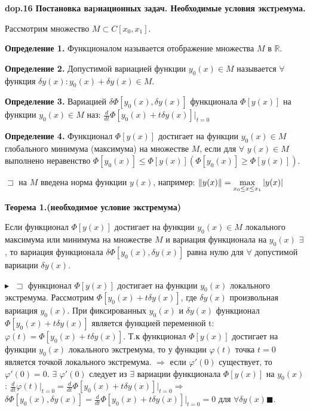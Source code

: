 \textbf{\LARGE dop.16 Постановка ваpиационных задач. Необходимые условия экстpемума.}

Рассмотрим множество $M \subset C[x_0, x_1]$.


\textbf{Определение 1.}
Функционалом называется отображение множества $M$ в $\mathbb{R}$.

\textbf{Определение 2.}
Допустимой вариацией функции $y_0(x) \in M$ называется $\forall$ функция $\delta y(x):y_0(x) + \delta y(x) \in M$.

\textbf{Определение 3.}
Вариацией $\delta\Phi[y_0(x), \delta y(x)]$ функционала
$\Phi[y(x)]$ на функции $y_0(x) \in M$ наз: $\frac{d}{dt}\Phi[y_0(x)+t\delta y(x)]\Big|_{t=0}$

\textbf{Определение 4.}
Функционал $\Phi[y(x)]$ достигает на функции
$y_0(x) \in M$ глобального минимума (максимума) на множестве $M$, если для $\forall$ $y(x) \in M$ выполнено неравенство $\Phi[y_0(x)]\leq\Phi[y(x)]  (\Phi[y_0(x)]\geq\Phi[y(x)])$.


$\sqsupset$ на  $M$ введена норма функции $y(x)$, например:
$\|y(x)\|=\displaystyle\max_{x_0\leq x \leq x_1} |y(x)|$


\textbf{Теорема 1.(необходимое условие экстремума)}

    Если функционал $\Phi[y(x)]$ достигает на функции
    $y_0(x) \in M$ локального максимума или минимума на множестве $M$ и
    вариация функционала на $y_0(x)$ $\exists$, то вариация функционала $\delta\Phi[y_0(x), \delta y(x)]$ равна нулю для $\forall$ допустимой вариации $\delta y(x)$.
    
$\blacktriangleright\;$
    $\sqsupset$ функционал $\Phi[y(x)]$ достигает на функции
    $y_0(x)$ локального экстремума. Рассмотрим $\Phi[y_0(x) + t\delta y(x)]$, где $\delta y(x)$
    произвольная вариация $y_0(x)$. При фиксированных $y_0(x)$ и $\delta y(x)$ функционал 
    $\Phi[y_0(x) + t\delta y(x)]$ является функцией переменной t:
    $\varphi(t) = \Phi[y_0(x) + t\delta y(x)].$
    Т.к  функционал $\Phi[y(x)]$ достигает на функции $y_0(x)$ локального
    экстремума, то у функции $\varphi(t)$ точка $t=0$ является точкой локального экстремума. $\Longrightarrow$ если $\varphi'(0)$ существует, то
    $\varphi'(0)=0$. $\exists$ $\varphi'(0)$ следует из $\exists$ вариации функционала $\Phi[y(x)]$ на $y_0(x)$: $\frac{d}{dt}\varphi(t)\Big|_{t=0}=\frac{d}{dt}\Phi[y_0(x)+t\delta y(x)]\Big|_{t=0} \Longrightarrow$
    $\delta \Phi[y_0(x), \delta y(x)]=\frac{d}{dt}\Phi[y_0(x)+t\delta y(x)]\Big|_{t=0}=0 \text{ для } \forall \delta y(x)$$\blacksquare$.


